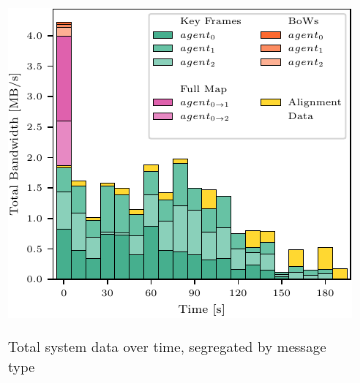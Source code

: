 \begin{figure}[h]
    \centering
    \begin{subfigure}[b]{0.55\linewidth}
        \centering
         {
            \includegraphics[width=0.9\linewidth, valign=t]{figures/apr11_mh_trajectory_b_bandwith.pdf}
        }
        \caption{Total system data over time, segregated by message type}
    \end{subfigure}%
    ~
    \begin{subfigure}[b]{0.45\linewidth}
        \centering
\end{subfigure}
\end{figure}
